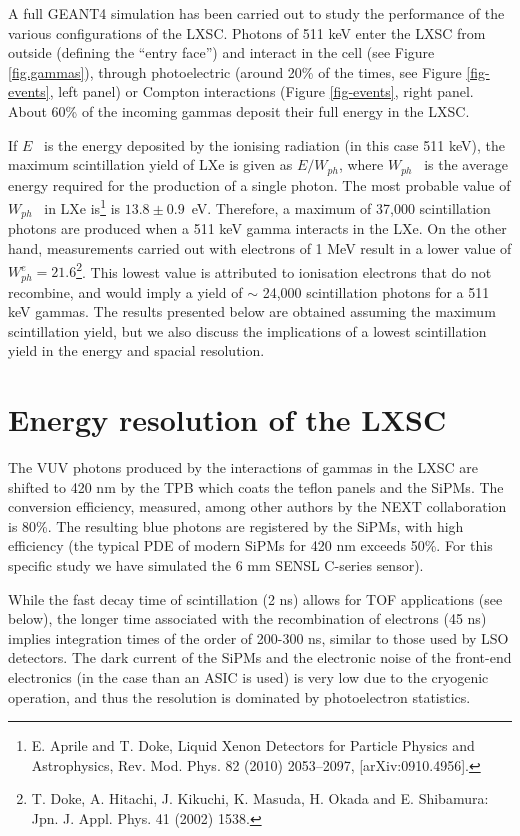 \documentclass{JINST}
\begin{document}
A full GEANT4 simulation has been carried out to study the performance of the various configurations of the LXSC. Photons of 511 keV enter the LXSC from outside (defining the ``entry face'') and interact in the cell (see Figure \ref{fig.gammas}), through photoelectric (around 20\% of the times, see Figure \ref{fig-events}, left panel) or Compton interactions (Figure \ref{fig-events}, right panel. About 60\% of the incoming gammas deposit their full energy in the LXSC. 

If $E$~ is the energy deposited by the ionising radiation (in this case 511 keV), the maximum scintillation yield of LXe is given as $E/W_{ph}$, where $W_{ph}$~ is the average energy required for the production of a single photon. The most probable value of $W_{ph}$~ in LXe  is\footnote{E. Aprile and T. Doke, Liquid Xenon Detectors for Particle Physics and Astrophysics, Rev. Mod. Phys. 82 (2010) 2053–2097, [arXiv:0910.4956].} is $13.8 \pm 0.9$~eV. Therefore, a maximum of 37,000 scintillation photons are produced when a 511 keV gamma interacts in the LXe. On the other hand, measurements carried out with electrons of 1 MeV result in a lower value of $W_{ph}^e = 21.6$\footnote{T. Doke, A. Hitachi, J. Kikuchi, K. Masuda, H. Okada and E. Shibamura: Jpn. J. Appl. Phys. 41 (2002) 1538.}. This lowest value is attributed to ionisation electrons that do not recombine, and would imply a yield of $\sim$ 24,000 scintillation photons for a 511 keV gammas. The results presented below are obtained assuming the maximum scintillation yield, but we also discuss the implications of a lowest scintillation yield in the energy and spacial resolution. 

\section{Energy resolution of the LXSC}

The VUV photons produced by the interactions of gammas in the LXSC are shifted to 420 nm by the TPB which coats the teflon panels and the SiPMs. The conversion efficiency, measured, among other authors by the NEXT collaboration is 80\%. The resulting blue photons are registered by the SiPMs, with high efficiency (the typical PDE of modern SiPMs for 420 nm exceeds 50\%. For this specific study we have simulated the 6 mm SENSL C-series sensor). 

While the fast decay time of scintillation (2 ns) allows for TOF applications (see below), the longer time associated with the recombination of electrons (45 ns) implies integration times of the order of 200-300 ns, similar to those used by LSO detectors. The dark current of the SiPMs and the electronic noise of the front-end electronics (in the case than an ASIC is used) is very low due to the cryogenic operation, and thus the resolution is dominated by photoelectron statistics. 
\end{document}
